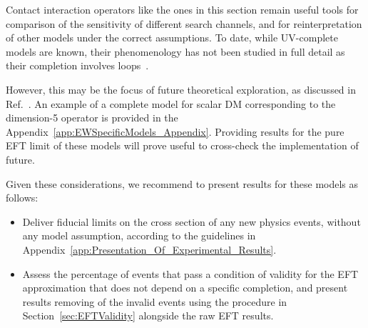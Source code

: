 Contact interaction operators like the ones in this section 
remain useful tools for comparison of the sensitivity of different search channels, 
and for reinterpretation of other models under the correct assumptions. 
To date, while UV-complete models are known, their phenomenology has
not been studied in full detail as their completion involves loops~. 

However, this may be the focus of future theoretical exploration, as discussed in Ref.~\cite{Crivellin:2015wva}.
An example of a complete model 
for scalar DM corresponding to the dimension-5 operator 
is provided in the Appendix~\ref{app:EWSpecificModels_Appendix}.
Providing results for the pure EFT limit of these models will prove useful
to cross-check the implementation of future. 

Given these considerations, we recommend to present results 
for these models as follows: 

\begin{itemize}
\item Deliver fiducial limits on the cross section of any new physics events, without any model assumption, according to the guidelines in Appendix~\ref{app:Presentation_Of_Experimental_Results}.  
\item Assess the percentage of events that pass a condition of validity for the EFT approximation that does not
depend on a specific completion, and present results removing 
of the invalid events using the procedure in Section~\ref{sec:EFTValidity} alongside the raw EFT results.
\end{itemize}


